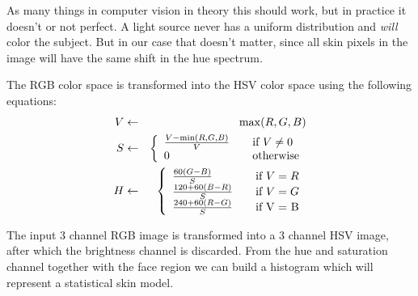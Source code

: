 As many things in computer vision in theory this should work, but in practice it doesn't or not perfect. A light source never has a uniform distribution and \emph{will} color the subject. But in our case that doesn't matter, since all skin pixels in the image will have the same shift in the hue spectrum.

The RGB color space is transformed into the HSV color space using the following equations:
\begin{eqnarray*}
  V & \leftarrow & \max(R,G,B) \\
  S & \leftarrow & \left\{
  \begin{array}{l l}
    \frac{V-\min(R, G, B)}{V} & \quad \text{if $V \neq 0$} \\
    0 						  & \quad \text{otherwise} \\
  \end{array} \right.\\
  H & \leftarrow & \left\{
  \begin{array}{l l}
    \frac{60(G - B)}{S}     & \quad \text{if $V = R$} \\
    \frac{120 + 60(B-R)}{S} & \quad \text{if $V = G$} \\
    \frac{240 + 60(R-G)}{S} & \quad \text{if V = B} \\
  \end{array} \right.\\
\end{eqnarray*}


The input 3 channel RGB image is transformed into a 3 channel HSV image, after which the brightness channel is discarded. From the hue and saturation channel together with the face region we can build a histogram which will represent a statistical skin model.

